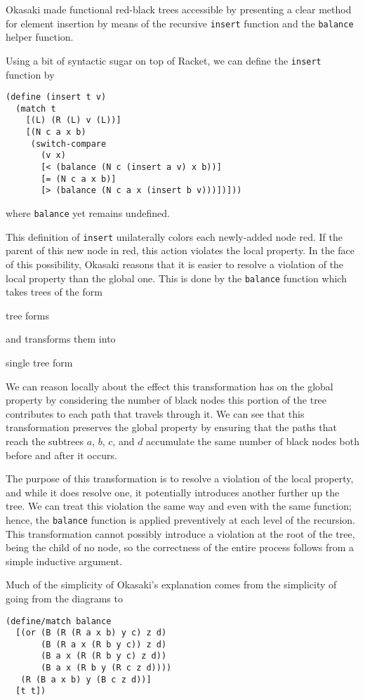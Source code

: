 \documentclass[preprint]{sigplanconf}
\begin{document}
Okasaki \cite{okasaki1999functional} made functional red-black trees accessible by presenting a clear method for element insertion by means of the recursive \texttt{insert} function and the \texttt{balance} helper function.

Using a bit of syntactic sugar on top of Racket, we can define the \texttt{insert} function by
\begin{verbatim}
(define (insert t v)
  (match t
    [(L) (R (L) v (L))]
    [(N c a x b)
     (switch-compare
       (v x)
       [< (balance (N c (insert a v) x b))]
       [= (N c a x b)]
       [> (balance (N c a x (insert b v)))])]))
\end{verbatim}
where \texttt{balance} yet remains undefined.

This definition of \texttt{insert} unilaterally colors each newly-added node red. If the parent of this new node in red, this action violates the local property. In the face of this possibility, Okasaki reasons that it is easier to resolve a violation of the local property than the global one. This is done by the \texttt{balance} function which takes trees of the form

tree forms

and transforms them into

single tree form

We can reason locally about the effect this transformation has on the global property by considering the number of black nodes this portion of the tree contributes to each path that travels through it. We can see that this transformation preserves the global property by ensuring that the paths that reach the subtrees $a$, $b$, $c$, and $d$ accumulate the same number of black nodes both before and after it occurs.

The purpose of this transformation is to resolve a violation of the local property, and while it does resolve one, it potentially introduces another further up the tree. We can treat this violation the same way and even with the same function; hence, the \texttt{balance} function is applied preventively at each level of the recursion. This transformation cannot possibly introduce a violation at the root of the tree, being the child of no node, so the correctness of the entire process follows from a simple inductive argument.

Much of the simplicity of Okasaki's explanation comes from the simplicity of going from the diagrams to
\begin{verbatim}
(define/match balance
  [(or (B (R (R a x b) y c) z d)
       (B (R a x (R b y c)) z d)
       (B a x (R (R b y c) z d))
       (B a x (R b y (R c z d))))
   (R (B a x b) y (B c z d))]
  [t t])
\end{verbatim}
\end{document}
